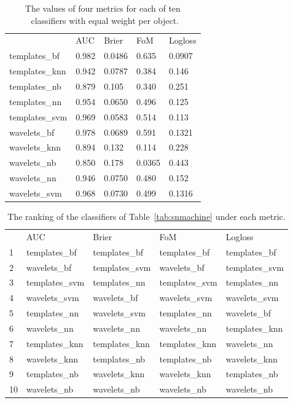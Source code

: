 \begin{table}[]
\begin{tabular}{lllll}
                           & AUC    & Brier   & FoM   & Logloss            \\
templates\_bf  						 & 0.982 & 0.0486  & 0.635  & 0.0907  \\
templates\_knn             & 0.942 & 0.0787  & 0.384 & 0.146  \\
templates\_nb              & 0.879 & 0.105  & 0.340  & 0.251 \\
templates\_nn							 & 0.954 & 0.0650  & 0.496   & 0.125 \\
templates\_svm             & 0.969 & 0.0583 & 0.514  & 0.113 \\
wavelets\_bf   						 & 0.978 & 0.0689  & 0.591  & 0.1321 \\
wavelets\_knn              & 0.894 & 0.132  & 0.114 & 0.228 \\
wavelets\_nb               & 0.850 & 0.178  & 0.0365 & 0.443  \\
wavelets\_nn 							 & 0.946 & 0.0750  & 0.480  & 0.152 \\
wavelets\_svm              & 0.968  & 0.0730  & 0.499  & 0.1316 \\
\end{tabular}
\caption{The values of four metrics for each of ten \snmachine\ classifiers with equal weight per object.}
	\label{tab:snmachinevals}
\end{table}

\begin{table}[]
\begin{tabular}{lllll}
  & AUC             & Brier           & FoM             & Logloss       \\
1 & templates\_bf 	& templates\_bf	 	& templates\_bf 	& templates\_bf \\
2 & wavelets\_bf	 	& templates\_svm 	& wavelets\_bf		& templates\_svm \\
3 & templates\_svm 	& templates\_nn 	& templates\_svm	& templates\_nn \\
4 & wavelets\_svm 	& wavelets\_bf 		& wavelets\_svm		& wavelets\_svm \\
5 & templates\_nn 	& wavelets\_svm 	& templates\_nn		& wavelets\_bf \\
6 & wavelets\_nn 		& wavelets\_nn 		& wavelets\_nn		& templates\_knn \\
7 & templates\_knn 	& templates\_knn 	& templates\_knn	& wavelets\_nn \\
8 & wavelets\_knn 	& templates\_nb 	& templates\_nb		& wavelets\_knn \\
9 & templates\_nb 	& wavelets\_knn 	& wavelets\_knn		& templates\_nb \\
10 & wavelets\_nb 	& wavelets\_nb 		& wavelets\_nb		& wavelets\_nb \\
\end{tabular}
\caption{The ranking of the classifiers of Table~\ref{tab:snmachine} under each metric.}
\label{tab:snmachinerank}
\end{table}

